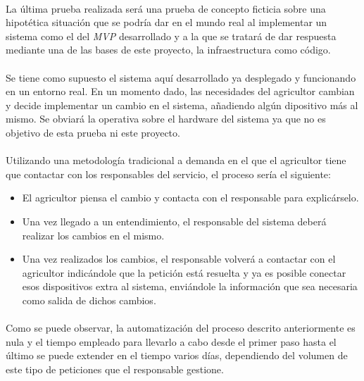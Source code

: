 \documentclass[../../memoria.tex]{subfiles}
\begin{document}
\paragraph{}
La última prueba realizada será una prueba de concepto ficticia sobre una hipotética situación que se podría dar en el mundo real al implementar un sistema como el del \textit{MVP} desarrollado y a la que se tratará de dar respuesta mediante una de las bases de este proyecto, la infraestructura como código.

\paragraph{}
Se tiene como supuesto el sistema aquí desarrollado ya desplegado y funcionando en un entorno real. En un momento dado, las necesidades del agricultor cambian y decide implementar un cambio en el sistema, añadiendo algún dipositivo más al mismo. Se obviará la operativa sobre el hardware del sistema ya que no es objetivo de esta prueba ni este proyecto.

\paragraph{}
Utilizando una metodología tradicional a demanda en el que el agricultor tiene que contactar con los responsables del servicio, el proceso sería el siguiente:

\begin{itemize}
    \item El agricultor piensa el cambio y contacta con el responsable para explicárselo.
    \item Una vez llegado a un entendimiento, el responsable del sistema deberá realizar los cambios en el mismo.
    \item Una vez realizados los cambios, el responsable volverá a contactar con el agricultor indicándole que la petición está resuelta y ya es posible conectar esos dispositivos extra al sistema, enviándole la información que sea necesaria como salida de dichos cambios.
\end{itemize}

\paragraph{}
Como se puede observar, la automatización del proceso descrito anteriormente es nula y el tiempo empleado para llevarlo a cabo desde el primer paso hasta el último se puede extender en el tiempo varios días, dependiendo del volumen de este tipo de peticiones que el responsable gestione.
\end{document}
